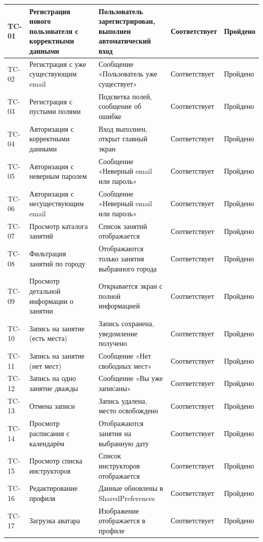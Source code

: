\begin{longtable}{|p{1.4cm}|p{4cm}|p{3.8cm}|p{3cm}|p{2.2cm}|}
	TC-01 & Регистрация нового пользователя с корректными данными & Пользователь зарегистрирован, выполнен автоматический вход & Соответствует & Пройдено \\
	\hline
	TC-02 & Регистрация с уже существующим email & Сообщение «Пользователь уже существует» & Соответствует & Пройдено \\
	\hline
	TC-03 & Регистрация с пустыми полями & Подсветка полей, сообщение об ошибке & Соответствует & Пройдено \\
	\hline
	TC-04 & Авторизация с корректными данными & Вход выполнен, открыт главный экран & Соответствует & Пройдено \\
	\hline
	TC-05 & Авторизация с неверным паролем & Сообщение «Неверный email или пароль» & Соответствует & Пройдено \\
	\hline
	TC-06 & Авторизация с несуществующим email & Сообщение «Неверный email или пароль» & Соответствует & Пройдено \\
	\hline
	TC-07 & Просмотр каталога занятий & Список занятий отображается & Соответствует & Пройдено \\
	\hline
	TC-08 & Фильтрация занятий по городу & Отображаются только занятия выбранного города & Соответствует & Пройдено \\
	\hline
	TC-09 & Просмотр детальной информации о занятии & Открывается экран с полной информацией & Соответствует & Пройдено \\
	\hline
	TC-10 & Запись на занятие (есть места) & Запись сохранена, уведомление получено & Соответствует & Пройдено \\
	\hline
	TC-11 & Запись на занятие (нет мест) & Сообщение «Нет свободных мест» & Соответствует & Пройдено \\
	\hline
	TC-12 & Запись на одно занятие дважды & Сообщение «Вы уже записаны» & Соответствует & Пройдено \\
	\hline
	TC-13 & Отмена записи & Запись удалена, место освобождено & Соответствует & Пройдено \\
	\hline
	TC-14 & Просмотр расписания с календарём & Отображаются занятия на выбранную дату & Соответствует & Пройдено \\
	\hline
	TC-15 & Просмотр списка инструкторов & Список инструкторов отображается & Соответствует & Пройдено \\
	\hline
	TC-16 & Редактирование профиля & Данные обновлены в SharedPreferences & Соответствует & Пройдено \\
	\hline
	TC-17 & Загрузка аватара & Изображение отображается в профиле & Соответствует & Пройдено \\

\end{longtable}
